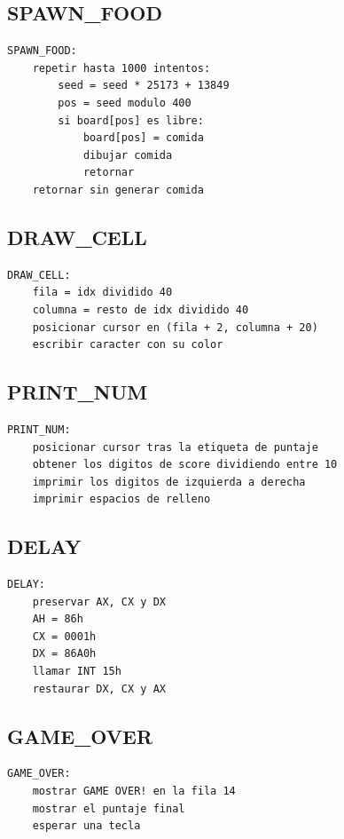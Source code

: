 \documentclass[10pt]{article}
\begin{document}
\subsection{SPAWN\_FOOD}
\begin{lstlisting}[language={},caption={Pseudocódigo de SPAWN\_FOOD.},label={lst:p-spawn}]
SPAWN_FOOD:
    repetir hasta 1000 intentos:
        seed = seed * 25173 + 13849
        pos = seed modulo 400
        si board[pos] es libre:
            board[pos] = comida
            dibujar comida
            retornar
    retornar sin generar comida
\end{lstlisting}

\subsection{DRAW\_CELL}
\begin{lstlisting}[language={},caption={Pseudocódigo de DRAW\_CELL.},label={lst:p-draw}]
DRAW_CELL:
    fila = idx dividido 40
    columna = resto de idx dividido 40
    posicionar cursor en (fila + 2, columna + 20)
    escribir caracter con su color
\end{lstlisting}

\subsection{PRINT\_NUM}
\begin{lstlisting}[language={},caption={Pseudocódigo de PRINT\_NUM.},label={lst:p-print}]
PRINT_NUM:
    posicionar cursor tras la etiqueta de puntaje
    obtener los digitos de score dividiendo entre 10
    imprimir los digitos de izquierda a derecha
    imprimir espacios de relleno
\end{lstlisting}

\subsection{DELAY}
\begin{lstlisting}[language={},caption={Pseudocódigo de DELAY.},label={lst:p-delay}]
DELAY:
    preservar AX, CX y DX
    AH = 86h
    CX = 0001h
    DX = 86A0h
    llamar INT 15h
    restaurar DX, CX y AX
\end{lstlisting}

\subsection{GAME\_OVER}
\begin{lstlisting}[language={},caption={Pseudocódigo de GAME\_OVER.},label={lst:p-over}]
GAME_OVER:
    mostrar GAME OVER! en la fila 14
    mostrar el puntaje final
    esperar una tecla
\end{lstlisting}
\end{document}

